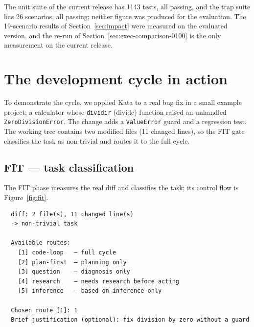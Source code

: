 \documentclass{sbc2019}%
\begin{document}
The unit suite of the current release has 1143 tests, all passing, and the
trap suite has 26 scenarios, all passing; neither figure was
produced for the evaluation. The 19-scenario results of
Section~\ref{sec:impact} were measured on the evaluated version, and the
re-run of Section~\ref{sec:exec-comparison-0100} is the only measurement on
the current release.

\section{The development cycle in action}
\label{sec:cycle}

To demonstrate the cycle, we applied Kata to a real bug fix in a small
example project: a calculator whose \texttt{dividir} (divide) function raised
an unhandled \texttt{ZeroDivisionError}. The change adds a
\texttt{ValueError} guard and a regression test. The working tree contains
two modified files (11 changed lines), so the FIT gate classifies the task
as non-trivial and routes it to the full cycle.

\subsection{FIT --- task classification}

The FIT phase measures the real diff and classifies the task; its
control flow is Figure~\ref{fig:fit}.

\begin{lstlisting}
  diff: 2 file(s), 11 changed line(s)
  -> non-trivial task

  Available routes:
    [1] code-loop   — full cycle
    [2] plan-first  — planning only
    [3] question    — diagnosis only
    [4] research    — needs research before acting
    [5] inference   — based on inference only

  Chosen route [1]: 1
  Brief justification (optional): fix division by zero without a guard
\end{lstlisting}
\end{document}
